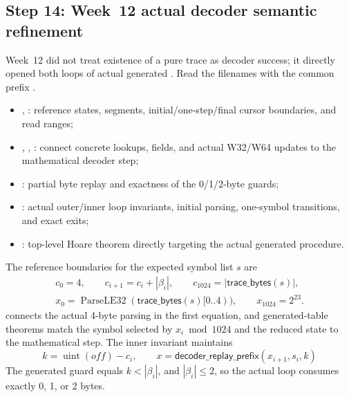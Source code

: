 \subsection{Step 14: Week~12 actual decoder semantic refinement}

Week~12 did not treat existence of a pure trace as decoder success; it directly
opened both loops of actual generated
. Read the filenames with the
common prefix .
\begin{itemize}
  \item {}, : reference states,
        segments, initial/one-step/final cursor boundaries, and read ranges;
  \item {}, ,
        : connect concrete
         lookups,  fields,
        and actual W32/W64 updates to the mathematical decoder step;
  \item {}: partial byte replay and exactness
        of the 0/1/2-byte guards;
  \item {}: actual outer/inner loop invariants,
        initial parsing, one-symbol transitions, and exact exits;
  \item {}: top-level Hoare theorem directly targeting
        the actual generated procedure.
\end{itemize}

The reference boundaries for the expected symbol list \(s\) are
\[
\begin{gathered}
 c_0=4,\qquad c_{i+1}=c_i+|\beta_i|,\qquad
 c_{1024}=|\mathsf{trace\_bytes}(s)|,\\
 x_0=\operatorname{ParseLE32}(\mathsf{trace\_bytes}(s)[0..4)),\qquad
 x_{1024}=2^{23}.
\end{gathered}
\]
 connects the actual 4-byte
parsing in the first equation, and generated-table theorems match the symbol
selected by \(x_i\bmod1024\) and the reduced state to the mathematical step.
The inner invariant maintains
\[
 k=\operatorname{uint}(off)-c_i,\qquad
 x=\mathsf{decoder\_replay\_prefix}(x_{i+1},s_i,k)
\]
The generated guard equals \(k<|\beta_i|\), and \(|\beta_i|\le2\), so the
actual loop consumes exactly 0, 1, or 2 bytes.

